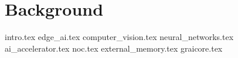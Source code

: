 \chapter{Background}
\label{ch:2}
{intro.tex}
{edge_ai.tex}
{computer_vision.tex}
{neural_networks.tex}
{ai_accelerator.tex}
{noc.tex}
{external_memory.tex}
{graicore.tex}

